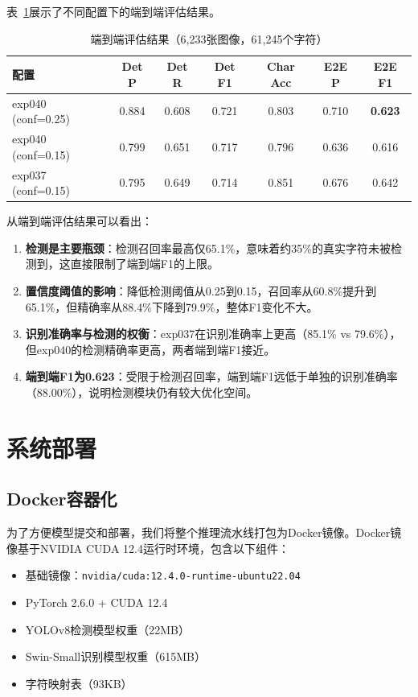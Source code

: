 \documentclass[12pt,a4paper]{article}
\begin{document}
表~\ref{tab:e2e}展示了不同配置下的端到端评估结果。

\begin{table}[H]
\centering
\caption{端到端评估结果（6,233张图像，61,245个字符）}
\label{tab:e2e}
\small
\begin{tabular}{lcccccc}
\toprule
\textbf{配置} & \textbf{Det P} & \textbf{Det R} & \textbf{Det F1} & \textbf{Char Acc} & \textbf{E2E P} & \textbf{E2E F1} \\
\midrule
exp040 (conf=0.25) & 0.884 & 0.608 & 0.721 & 0.803 & 0.710 & \textbf{0.623} \\
exp040 (conf=0.15) & 0.799 & 0.651 & 0.717 & 0.796 & 0.636 & 0.616 \\
exp037 (conf=0.15) & 0.795 & 0.649 & 0.714 & 0.851 & 0.676 & 0.642 \\
\bottomrule
\end{tabular}
\end{table}

从端到端评估结果可以看出：
\begin{enumerate}
    \item \textbf{检测是主要瓶颈}：检测召回率最高仅65.1\%，意味着约35\%的真实字符未被检测到，这直接限制了端到端F1的上限。
    \item \textbf{置信度阈值的影响}：降低检测阈值从0.25到0.15，召回率从60.8\%提升到65.1\%，但精确率从88.4\%下降到79.9\%，整体F1变化不大。
    \item \textbf{识别准确率与检测的权衡}：exp037在识别准确率上更高（85.1\% vs 79.6\%），但exp040的检测精确率更高，两者端到端F1接近。
    \item \textbf{端到端F1为0.623}：受限于检测召回率，端到端F1远低于单独的识别准确率（88.00\%），说明检测模块仍有较大优化空间。
\end{enumerate}

\section{系统部署}

\subsection{Docker容器化}

为了方便模型提交和部署，我们将整个推理流水线打包为Docker镜像。Docker镜像基于NVIDIA CUDA 12.4运行时环境，包含以下组件：

\begin{itemize}
    \item 基础镜像：\texttt{nvidia/cuda:12.4.0-runtime-ubuntu22.04}
    \item PyTorch 2.6.0 + CUDA 12.4
    \item YOLOv8检测模型权重（22MB）
    \item Swin-Small识别模型权重（615MB）
    \item 字符映射表（93KB）
\end{itemize}
\end{document}
